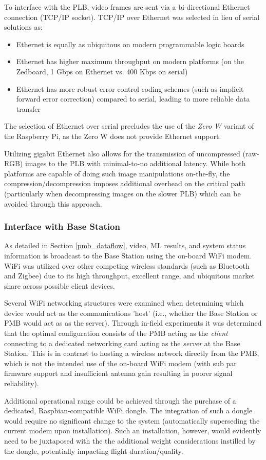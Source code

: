 To interface with the PLB, video frames are sent via a bi-directional Ethernet connection (TCP/IP socket). TCP/IP over Ethernet was selected in lieu of serial solutions as:
\begin{itemize}
\item Ethernet is equally as ubiquitous on modern programmable logic boards
\item Ethernet has higher maximum throughput on modern platforms (on the Zedboard, 1 Gbps on Ethernet vs. 400 Kbps on serial)
\item Ethernet has more robust error control coding schemes (such as implicit forward error correction\cite{mclaughlin_warland}) compared to serial, leading to more reliable data transfer
\end{itemize} 

The selection of Ethernet over serial precludes the use of the \textit{Zero W} variant of the Raspberry Pi, as the Zero W does not provide Ethernet support. 

Utilizing gigabit Ethernet also allows for the transmission of uncompressed (raw-RGB) images to the PLB with minimal-to-no additional latency. While both platforms are capable of doing such image manipulations on-the-fly, the compression/decompression imposes additional overhead on the critical path (particularly when decompressing images on the slower PLB) which can be avoided through this approach. 

\subsubsection{Interface with Base Station}

As detailed in Section \ref{pmb_dataflow}, video, ML results, and system status information is broadcast to the Base Station using the on-board WiFi modem. WiFi was utilized over other competing wireless standards (such as Bluetooth and Zigbee) due to its high throughput, excellent range, and ubiquitous market share across possible client devices.

Several WiFi networking structures were examined when determining which device would act as the communications 'host' (i.e., whether the Base Station or PMB would act as as the server). Through in-field experiments it was determined that the optimal configuration consists of the PMB acting as the \textit{client} connecting to a dedicated networking card acting as the \textit{server} at the Base Station. This is in contrast to hosting a wireless network directly from the PMB, which is not the intended use of the on-board WiFi modem (with sub par firmware support and insufficient antenna gain resulting in poorer signal reliability). 

Additional operational range could be achieved through the purchase of a dedicated, Raspbian-compatible WiFi dongle. The integration of such a dongle would require no significant change to the system (automatically superseding the current modem upon installation). Such an installation, however, would evidently need to be juxtaposed with the the additional weight considerations instilled by the dongle, potentially impacting flight duration/quality.
